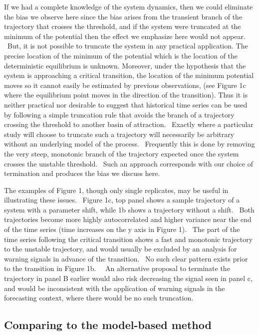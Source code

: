 \documentclass[authoryear,review,12pt]{elsarticle}
\begin{document}
If we had a complete knowledge of the system dynamics, then we could
eliminate the bias we observe here since the bias arises from the
transient branch of the trajectory that crosses the threshold, and
if the system were truncated at the minimum of the potential then the
effect we emphasize here would not appear.  But, it is not possible to
truncate the system in any practical application. The precise location of
the minimum of the potential which is the location of the deterministic
equilibrium is unknown. Moreover, under the hypothesis that the system is
approaching a critical transition, the location of the minimum potential
moves so it cannot easily be estimated by previous observations, (see
Figure 1c where the equilibrium point moves in the direction of the
transition). Thus it is neither practical nor desirable to suggest that
historical time series can be used by following a simple truncation rule
that avoids the branch of a trajectory crossing the threshold to another
basin of attraction.  Exactly where a particular study will choose
to truncate such a trajectory will necessarily be arbitrary without an
underlying model of the process.  Frequently this is done by removing
the very steep, monotonic branch of the trajectory expected once the
system crosses the unstable threshold.  Such an approach corresponds
with our choice of termination and produces the bias we discuss here.

The examples of Figure 1, though only single replicates, may be useful
in illustrating these issues.  Figure 1c, top panel shows a sample
trajectory of a system with a parameter shift, while 1b shows a trajectory
without a shift.  Both trajectories become more highly autocorrelated
and higher variance near the end of the time series (time increases
on the y axis in Figure 1).  The part of the time series following
the critical transition shows a fast and monotonic trajectory to the
unstable trajectory, and would usually be excluded by an analysis for
warning signals in advance of the transition.  No such clear pattern
exists prior to the transition in Figure 1b.   An alternative proposal
to terminate the trajectory in panel B earlier would also risk decreasing
the signal seen in panel c, and would be inconsistent with the application
of warning signals in the forecasting context, where there would be no
such truncation.

\subsection{Comparing to the model-based method}
\end{document}
